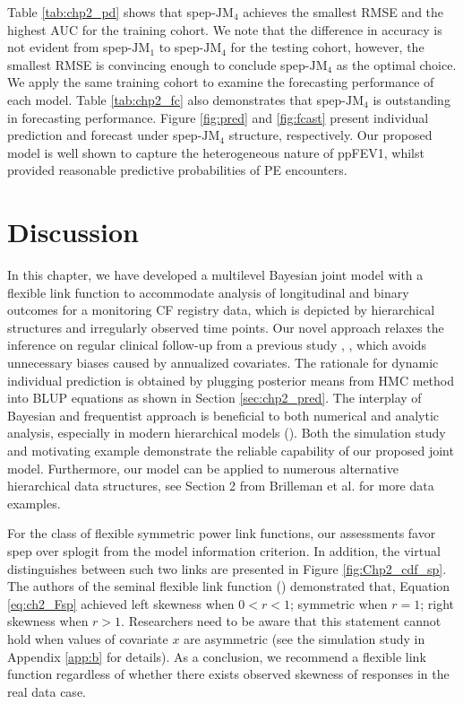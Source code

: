 Table \ref{tab:chp2_pd} shows that spep-$\mbox{JM}_4$ achieves the smallest RMSE and the highest AUC for the training cohort. We note that the difference in accuracy is not evident from spep-$\mbox{JM}_1$ to spep-$\mbox{JM}_4$ for the testing cohort, however, the smallest RMSE is convincing enough to conclude spep-$\mbox{JM}_4$ as the optimal choice. We apply the same training cohort to examine the forecasting performance of each model. Table \ref{tab:chp2_fc} also demonstrates that spep-$\mbox{JM}_4$ is outstanding in forecasting performance. Figure \ref{fig:pred} and \ref{fig:fcast} present individual prediction and forecast under spep-$\mbox{JM}_4$ structure, respectively. Our proposed model is well shown to capture the heterogeneous nature of ppFEV1, whilst provided reasonable predictive probabilities of PE encounters.

\section{Discussion} \label{sec:chp2_con}

In this chapter, we have developed a multilevel Bayesian joint model with a flexible link function to accommodate analysis of longitudinal and binary outcomes for a monitoring CF registry data, which is depicted by hierarchical structures and irregularly observed time points. Our novel approach relaxes the inference on regular clinical follow-up from a previous study \cite{Su2020}, \cite{Su2021}, which avoids unnecessary biases caused by annualized covariates. The rationale for dynamic individual prediction is obtained by plugging posterior means from HMC method into BLUP equations as shown in Section \ref{sec:chp2_pred}. The interplay of Bayesian and frequentist approach is beneficial to both numerical and analytic analysis, especially in modern hierarchical models (\cite{Bayarri2004}). Both the simulation study and motivating example demonstrate the reliable capability of our proposed joint model. Furthermore, our model can be applied to numerous alternative hierarchical data structures, see Section 2 from Brilleman et al. \cite{Brilleman2019} for more data examples. 

For the class of flexible symmetric power link functions, our assessments favor spep over splogit from the model information criterion. In addition, the virtual distinguishes between such two links are presented in Figure \ref{fig:Chp2_cdf_sp}. The authors of the seminal flexible link function (\cite{Jiang2013}) demonstrated that, Equation \ref{eq:ch2_Fsp} achieved left skewness when $0<r<1$; symmetric when $r=1$; right skewness when $r>1$. Researchers need to be aware that this statement cannot hold when values of covariate $x$ are asymmetric (see the simulation study in Appendix \ref{app:b} for details). As a conclusion, we recommend a flexible link function regardless of whether there exists observed skewness of responses in the real data case. 

